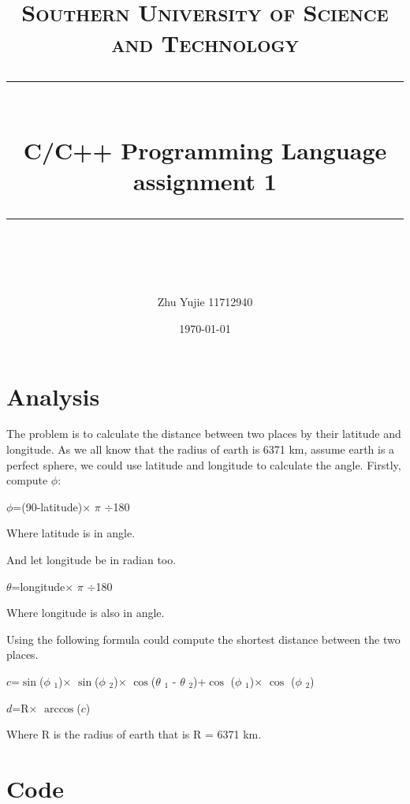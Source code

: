 \documentclass[11pt]{scrartcl} %
\title{	
	\normalfont\normalsize
	\textsc{Southern University of Science and Technology}\\ %
	\vspace{25pt} %
	\rule{\linewidth}{0.5pt}\\ %
	\vspace{20pt} %
	{\huge C/C++ Programming Language assignment 1}\\ %
	\vspace{12pt} %
	\rule{\linewidth}{2pt}\\ %
	\vspace{12pt} %
}
\author{\LARGE Zhu Yujie 11712940} %
\date{\normalsize\today} %
\begin{document}
\noindent

\maketitle %


\section{Analysis}

    The problem is to calculate the distance between two places by their latitude and longitude. As we all know that the radius of earth is 6371 km, assume earth is a perfect sphere, we could use latitude and longitude to calculate the angle. Firstly, compute $\phi$:
    \par
    \centerline{\large $\phi$=(90-latitude)$\times$ $\pi$ $\div$180}
    \par Where latitude is in angle.
    \par And let longitude be in radian too.
    \par
    \centerline{\large $\theta$=longitude$\times$ $\pi$ $\div$180}
    \par Where longitude is also in angle.
    \par
    Using the following formula could compute the shortest distance between the two places.
    \par
    \centerline{\large $c$=$\sin$($\phi$ $_1$)$\times$ $\sin$($\phi$ $_2$)$\times$ $\cos$($\theta$ $_1$ - $\theta$ $_2$)+$\cos$ ($\phi$ $_1$)$\times$ $\cos$ ($\phi$ $_2$)  }
    \centerline{\large $d$=R$\times$ $\arccos$($c$)}
    \par Where R is the radius of earth that is R = 6371 km.






\section{Code}

\vspace{20pt}
\end{document}
